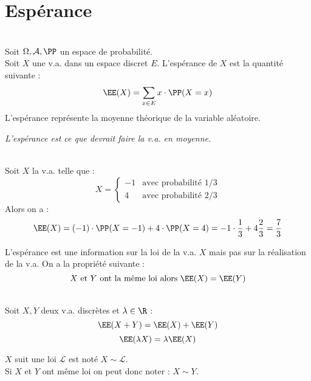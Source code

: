 \documentclass[12pt,fleqn]{report} %
\begin{document}
\section{Espérance}


\begin{definition}\text{ }\\
	Soit $\Omega,\mathcal{A},\PP$ un espace de probabilité. \\ Soit $X$ une v.a. dans un espace discret $E$. L'espérance de $X$ est la quantité suivante : 
	\[
	\EE(X) = \sum\limits_{x \in E} x\cdot\PP(X = x)
	\]
	L'espérance représente la moyenne théorique de la variable aléatoire.
\end{definition}
\textit{L'espérance est ce que devrait faire la v.a. en moyenne.}
\begin{example}\text{ }\\
	
	Soit $X$ la v.a. telle que :  \[
	X = \left\lbrace \begin{array}{ll}
	-1 & \text{avec probabilité } 1/3 \\
	4 & \text{avec probabilité } 2/3
	\end{array}\right.
	\]
	Alors on a :\[
	\EE(X) = (-1)\cdot \PP(X = -1) + 4\cdot \PP(X = 4) = -1 \cdot \frac{1}{3} + 4\frac{2}{3} = \frac{7}{3}
	\]
\end{example}
\begin{remark}
	L'espérance est une information sur la loi de la v.a. $X$ mais pas sur la réalisation de la v.a. On a la propriété suivante : 
	\[
	X \text{ et } Y \text{ ont la même loi alors } \EE(X) = \EE(Y)
	\]
\end{remark}

\begin{proposition}\text{ }\\
	Soit $X,Y$ deux v.a. discrètes et $\lambda \in \R$ :
	\[
	\EE(X + Y) = \EE(X) + \EE(Y)
	\]
	\[
	\EE(\lambda X) = \lambda \EE(X)
	\]
\end{proposition}

\begin{remark}
	$X$ suit une loi $\mathcal{L}$ est noté $X \sim \mathcal{L}$. \\
	Si $X$ et $Y$ ont même loi on peut donc noter : $X \sim Y$.
\end{remark}

\end{document}
